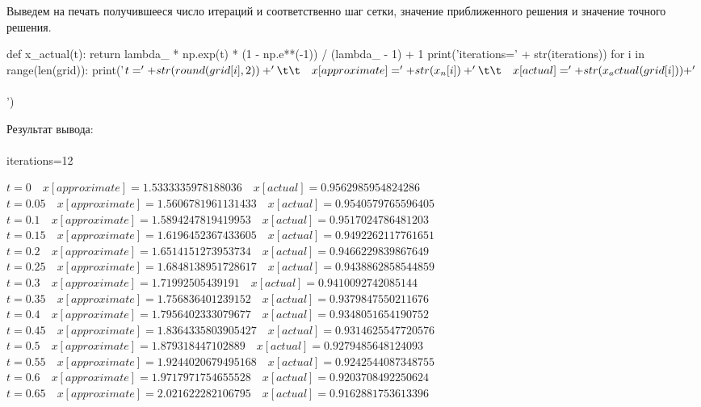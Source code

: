 \documentclass[a4paper, 12pt]{report}
\begin{document}
			Выведем на печать получившееся число итераций и соответственно шаг сетки, значение приближенного решения и значение точного решения.
			\begin{python}
				def x_actual(t):
					return lambda_ * np.exp(t) * (1 - np.e**(-1)) / (lambda_ - 1) + 1
				print('iterations=' + str(iterations))
				for i in range(len(grid)):
					print('$t=' + str(round(grid[i], 2)) + '\t\t\quad x[approximate]=' + str(x_n[i]) + '\t\t\quad x[actual]=' + str(x_actual(grid[i])) + '$\\\\')\end{python}
				Результат вывода:\\\\
				iterations=12
				\begin{center}
					$t=0		\quad x[approximate]=1.5333335978188036		\quad x[actual]=0.9562985954824286$\\
					$t=0.05		\quad x[approximate]=1.5606781961131433		\quad x[actual]=0.9540579765596405$\\
					$t=0.1		\quad x[approximate]=1.5894247819419953		\quad x[actual]=0.9517024786481203$\\
					$t=0.15		\quad x[approximate]=1.6196452367433605		\quad x[actual]=0.9492262117761651$\\
					$t=0.2		\quad x[approximate]=1.6514151273953734		\quad x[actual]=0.9466229839867649$\\
					$t=0.25		\quad x[approximate]=1.6848138951728617		\quad x[actual]=0.9438862858544859$\\
					$t=0.3		\quad x[approximate]=1.71992505439191		\quad x[actual]=0.9410092742085144$\\
					$t=0.35		\quad x[approximate]=1.756836401239152		\quad x[actual]=0.9379847550211676$\\
					$t=0.4		\quad x[approximate]=1.7956402333079677		\quad x[actual]=0.9348051654190752$\\
					$t=0.45		\quad x[approximate]=1.8364335803905427		\quad x[actual]=0.9314625547720576$\\
					$t=0.5		\quad x[approximate]=1.879318447102889		\quad x[actual]=0.9279485648124093$\\
					$t=0.55		\quad x[approximate]=1.9244020679495168		\quad x[actual]=0.9242544087348755$\\
					$t=0.6		\quad x[approximate]=1.9717971754655528		\quad x[actual]=0.9203708492250624$\\
					$t=0.65		\quad x[approximate]=2.021622282106795		\quad x[actual]=0.9162881753613396$\\

\end{center}
\end{document}
